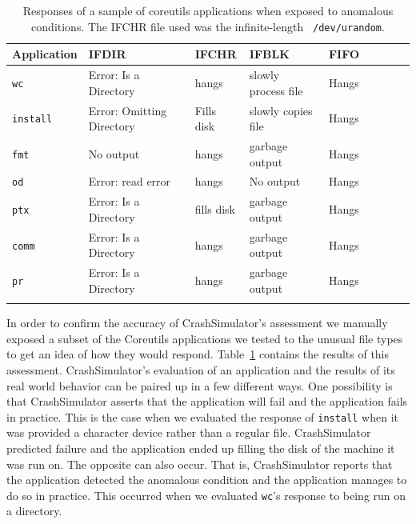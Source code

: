 \begin{table}[t]
    \scriptsize{}
    \begin{tabular}{l  l  l  l  l  l  l  l  l}
    \toprule{}
        Application         & IFDIR                     & IFCHR       & IFBLK                & FIFO \\
\hline
        {\tt wc}            & Error: Is a Directory     & hangs       & slowly process file  & Hangs\\
        {\tt install}       & Error: Omitting Directory & Fills disk  & slowly copies file   & Hangs\\
        {\tt fmt}           & No output                 & hangs       & garbage output       & Hangs\\
        {\tt od}            & Error: read error         & hangs       & No output            & Hangs\\
        {\tt ptx}           & Error: Is a Directory     & fills disk  & garbage output       & Hangs\\
        {\tt comm}          & Error: Is a Directory     & hangs       & garbage output       & Hangs\\
        {\tt pr}            & Error: Is a Directory     & hangs       & garbage output       & Hangs\\
\hline
    \bottomrule{}
    \end{tabular}
    \caption{Responses of a sample of coreutils applications when exposed to
      anomalous conditions.  The IFCHR file used was the infinite-length {\tt
        /dev/urandom}.}
    \label{table:applicationresponses}
\end{table}


In order to confirm the accuracy of CrashSimulator's assessment we manually
exposed a subset of the Coreutils applications we tested to the unusual
file types to get an idea of how they would respond.
Table~\ref{table:applicationresponses} contains the results of this
assessment.  CrashSimulator's evaluation of an application and the results
of its real world behavior can be paired up in a few different ways.  One
possibility is that CrashSimulator asserts that the application will fail
and the application fails in practice.  This is the case when we evaluated
the response of  {\tt install} when it was provided a character device
rather than a regular file. CrashSimulator predicted failure and the
application ended up filling the disk of the machine it was run on.  The
opposite can also occur.  That is, CrashSimulator reports that the
application detected the anomalous condition and the application manages to
do so in practice.  This occurred when we evaluated {\tt wc}'s response to
being run on a directory.

